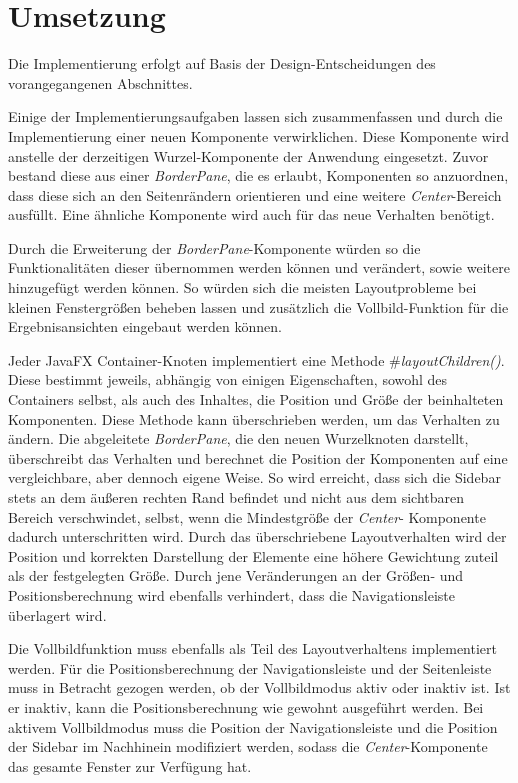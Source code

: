 \section{Umsetzung} \label{sec:responsiveImplementation}
Die Implementierung erfolgt auf Basis der Design-Entscheidungen des vorangegangenen Abschnittes.\par
{}
Einige der Implementierungsaufgaben lassen sich zusammenfassen und durch die Implementierung einer neuen Komponente verwirklichen. Diese Komponente wird anstelle der derzeitigen Wurzel-Komponente der Anwendung eingesetzt. Zuvor bestand diese aus einer \textit{BorderPane}, die es erlaubt, Komponenten so anzuordnen, dass diese sich an den Seitenrändern orientieren und eine weitere \textit{Center}-Bereich ausfüllt. Eine ähnliche Komponente wird auch für das neue Verhalten benötigt.\par
Durch die Erweiterung der \textit{BorderPane}-Komponente würden so die Funktionalitäten dieser übernommen werden können und verändert, sowie weitere hinzugefügt werden können. So würden sich die meisten Layoutprobleme bei kleinen Fenstergrößen beheben lassen und zusätzlich die Vollbild-Funktion für die Ergebnisansichten eingebaut werden können.\par
Jeder JavaFX Container-Knoten implementiert eine Methode \textit{$\#$layoutChildren()}. Diese bestimmt jeweils, abhängig von einigen Eigenschaften, sowohl des Containers selbst, als auch des Inhaltes, die Position und Größe der beinhalteten Komponenten. Diese Methode kann überschrieben werden, um das Verhalten zu ändern. Die abgeleitete \textit{BorderPane}, die den neuen Wurzelknoten darstellt, überschreibt das Verhalten und berechnet die Position der Komponenten auf eine vergleichbare, aber dennoch eigene Weise. So wird erreicht, dass sich die Sidebar stets an dem äußeren rechten Rand befindet und nicht aus dem sichtbaren Bereich verschwindet, selbst, wenn die Mindestgröße der \textit{Center}- Komponente dadurch unterschritten wird. Durch das überschriebene Layoutverhalten wird der Position und korrekten Darstellung der Elemente eine höhere Gewichtung zuteil als der festgelegten Größe. Durch jene Veränderungen an der Größen- und Positionsberechnung wird ebenfalls verhindert, dass die Navigationsleiste überlagert wird.\par
Die Vollbildfunktion muss ebenfalls als Teil des Layoutverhaltens implementiert werden. Für die Positionsberechnung der Navigationsleiste und der Seitenleiste muss in Betracht gezogen werden, ob der Vollbildmodus aktiv oder inaktiv ist. Ist er inaktiv, kann die Positionsberechnung wie gewohnt ausgeführt werden. Bei aktivem Vollbildmodus muss die Position der Navigationsleiste und die Position der Sidebar im Nachhinein modifiziert werden, sodass die \textit{Center}-Komponente das gesamte Fenster zur Verfügung hat.\par
